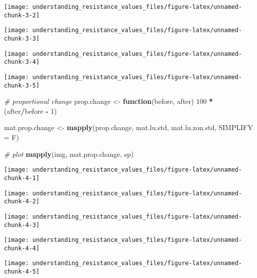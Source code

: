 \documentclass[]{article}
\newenvironment{Shaded}{\begin{snugshade}}{\end{snugshade}}
\newcommand{\CommentTok}[1]{\textcolor[rgb]{0.56,0.35,0.01}{\textit{#1}}}
\newcommand{\ControlFlowTok}[1]{\textcolor[rgb]{0.13,0.29,0.53}{\textbf{#1}}}
\newcommand{\DataTypeTok}[1]{\textcolor[rgb]{0.13,0.29,0.53}{#1}}
\newcommand{\DecValTok}[1]{\textcolor[rgb]{0.00,0.00,0.81}{#1}}
\newcommand{\KeywordTok}[1]{\textcolor[rgb]{0.13,0.29,0.53}{\textbf{#1}}}
\newcommand{\NormalTok}[1]{#1}
\newcommand{\OperatorTok}[1]{\textcolor[rgb]{0.81,0.36,0.00}{\textbf{#1}}}
\newcommand{\StringTok}[1]{\textcolor[rgb]{0.31,0.60,0.02}{#1}}
\begin{document}
\begin{center}\texttt{[image: understanding\_resistance\_values\_files/figure-latex/unnamed-chunk-3-2]} \end{center}

\begin{center}\texttt{[image: understanding\_resistance\_values\_files/figure-latex/unnamed-chunk-3-3]} \end{center}

\begin{center}\texttt{[image: understanding\_resistance\_values\_files/figure-latex/unnamed-chunk-3-4]} \end{center}

\begin{center}\texttt{[image: understanding\_resistance\_values\_files/figure-latex/unnamed-chunk-3-5]} \end{center}

\begin{Shaded}
\begin{Highlighting}[]
\CommentTok{# proportional change}
\NormalTok{prop.change <-}\StringTok{ }\ControlFlowTok{function}\NormalTok{(before, after) }\DecValTok{100} \OperatorTok{*}\StringTok{ }\NormalTok{(after}\OperatorTok{/}\NormalTok{before }\OperatorTok{-}\StringTok{ }\DecValTok{1}\NormalTok{)}

\NormalTok{mat.prop.change <-}\StringTok{ }\KeywordTok{mapply}\NormalTok{(prop.change, mat.lu.std, mat.lu.zon.std, }\DataTypeTok{SIMPLIFY =}\NormalTok{ F)}

\CommentTok{# plot}
\KeywordTok{mapply}\NormalTok{(img, mat.prop.change, sp)}
\end{Highlighting}
\end{Shaded}

\begin{center}\texttt{[image: understanding\_resistance\_values\_files/figure-latex/unnamed-chunk-4-1]} \end{center}

\begin{center}\texttt{[image: understanding\_resistance\_values\_files/figure-latex/unnamed-chunk-4-2]} \end{center}

\begin{center}\texttt{[image: understanding\_resistance\_values\_files/figure-latex/unnamed-chunk-4-3]} \end{center}

\begin{center}\texttt{[image: understanding\_resistance\_values\_files/figure-latex/unnamed-chunk-4-4]} \end{center}

\begin{center}\texttt{[image: understanding\_resistance\_values\_files/figure-latex/unnamed-chunk-4-5]} \end{center}
\end{document}
